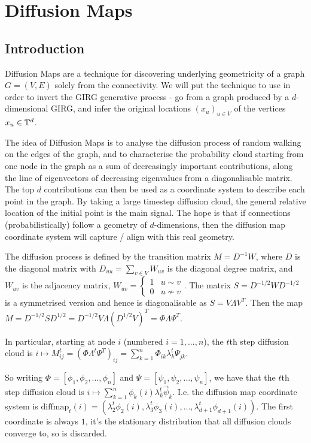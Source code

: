 \chapter{Diffusion Maps}
\section{Introduction}

Diffusion Maps are a technique for discovering underlying geometricity of a graph $G=(V,E)$ solely from the connectivity. We will put the technique to use in order to invert the GIRG generative process - go from a graph produced by a $d$-dimensional GIRG, and infer the original locations $(x_u)_{u\in V}$ of the vertices $x_u \in \mathbb{T}^d$.

The idea of Diffusion Maps is to analyse the diffusion process of random walking on the edges of the graph, and to characterise the probability cloud starting from one node in the graph as a sum of decreasingly important contributions, along the line of eigenvectors of decreasing eigenvalues from a diagonalisable matrix. The top $d$ contributions can then be used as a coordinate system to describe each point in the graph. By taking a large timestep diffusion cloud, the general relative location of the initial point is the main signal. The hope is that if connections (probabilistically) follow a geometry of $d$-dimensions, then the diffusion map coordinate system will capture / align with this real geometry.

The diffusion process is defined by the transition matrix $M = D^{-1}W$, where $D$ is the diagonal matrix with $D_{uu} = \sum_{v\in V} W_{uv}$ is the diagonal degree matrix, and $W_{uv}$ is the adjacency matrix, $W_{uv} = \begin{cases}1 & u \sim v \\0 & u \nsim v \end{cases}$. The matrix $S = D^{-1/2} W D^{-1/2}$ is a symmetrised version and hence is diagonalisable as $S = V \Lambda V^T$. Then the map $M = D^{-1/2} S D^{1/2} = D^{-1/2} V \Lambda (D^{1/2} V)^T = \Phi \Lambda \Psi^T$.

In particular, starting at node $i$ (numbered $i=1,...,n$), the $t$th step diffusion cloud is $i \mapsto M^t_{ij} = (\Phi \Lambda^t \Psi^T)_{ij} = \sum_{k=1}^n \Phi_{ik} \lambda_k^t \Psi_{jk}$.

So writing $\Phi = [\phi_1, \phi_2, ..., \phi_n]$ and $\Psi = [\psi_1, \psi_2, ..., \psi_n]$, we have that the $t$th step diffusion cloud is $i \mapsto \sum_{k=1}^n \phi_k(i) \lambda_k^t \vec{\psi}_k$. I.e. the diffusion map coordinate system is $\text{diffmap}_t(i) = (\lambda_2^t \phi_2(i), \lambda_3^t \phi_3(i), ..., \lambda_{d+1}^t \phi_{d+1}(i))$. The first coordinate is always $1$, it's the stationary distribution that all diffusion clouds converge to, so is discarded.

